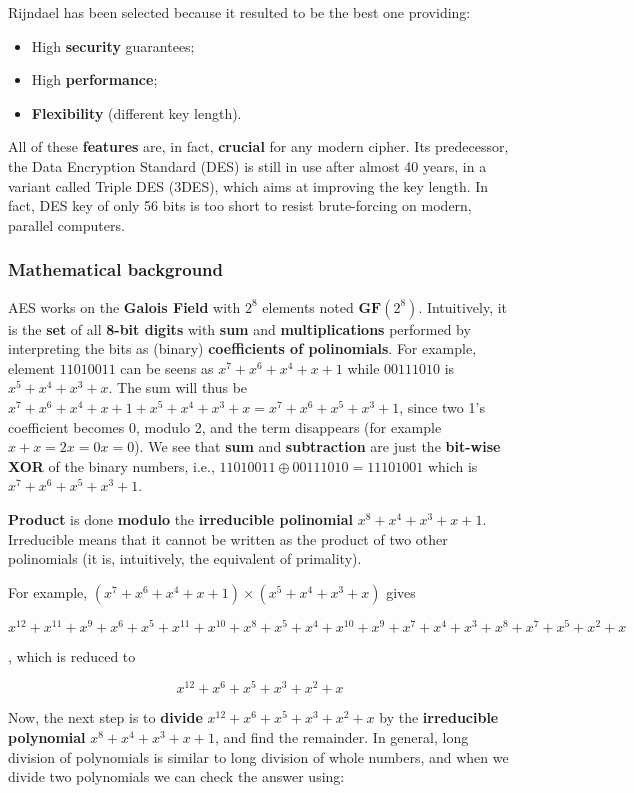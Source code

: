 Rijndael has been selected because it resulted to be the best one providing:

\begin{itemize}
    \item High \textbf{security} guarantees;
    \item High \textbf{performance};
    \item \textbf{Flexibility} (different key length).
\end{itemize}

All of these \textbf{features} are, in fact, \textbf{crucial} for any modern cipher. Its predecessor, the Data Encryption Standard (DES) is still in use after almost 40 years, in a variant called Triple DES (3DES), which aims at improving the key length. In fact, DES key of only 56 bits is too short to resist brute-forcing on modern, parallel computers.

\subsubsection{Mathematical background}
AES works on the \textbf{Galois Field} with $2^8$ elements noted $\mathbf{GF}(2^8)$. Intuitively, it is the \textbf{set} of all \textbf{8-bit digits} with \textbf{sum} and \textbf{multiplications} performed by interpreting the bits as (binary) \textbf{coefficients of polinomials}. For example, element $11010011$ can be seens as $x^7 + x^6 + x^4 + x + 1$ while $00111010$ is $x^5+x^4+x^3 + x$. The sum will thus be $x^7+x^6+x^4+x+1+x^5+x^4+x^3+x=x^7+x^6+x^5+x^3+1$, since two 1’s coefficient becomes 0, modulo 2, and the term disappears (for example $x + x = 2x = 0x = 0$). We see that \textbf{sum} and \textbf{subtraction} are just the \textbf{bit-wise XOR} of the binary numbers, i.e., $11010011 \oplus 00111010 = 11101001$ which is $x^7+x^6+x^5+x^3+1$.

\textbf{Product} is done \textbf{modulo} the \textbf{irreducible polinomial} $x^8 + x^4 + x^3 + x + 1$. Irreducible means that it cannot be written as the product of two other polinomials (it is, intuitively, the equivalent of primality). 

For example, $(x^7 + x^6 + x^4 + x + 1) \times (x^5+x^4+x^3 + x)$ gives

$$x^{12} + x^{11} + x^9 + x^6 + x^5+x^{11}+x^{10}+x^8+x^5+x^4+x^{10}+x^9+x^7+x^4+x^3+x^8+x^7+x^5+x^2+x$$

, which is reduced to

$$x^{12}+x^6+x^5+x^3+x^2+x$$

Now, the next step is to \textbf{divide} $x^{12}+x^6+x^5+x^3+x^2+x$ by the \textbf{irreducible polynomial} $x^8 + x^4 + x^3 + x + 1$, and find the remainder. In general, long division of polynomials is similar to long division of whole numbers, and when we divide two polynomials we can check the answer using:

